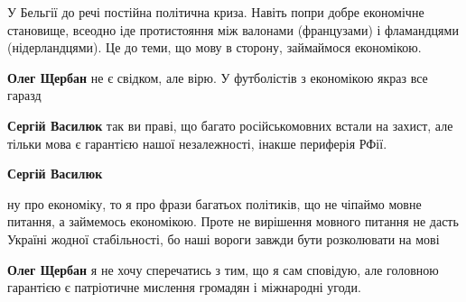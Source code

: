 \begin{itemize}
\begin{itemize}
У Бельгії до речі постійна політична криза. Навіть попри добре економічне
становище, всеодно іде протистояння між валонами (французами) і фламандцями
(нідерландцями). Це до теми, що мову в сторону, займаймося економікою.

 
\textbf{Олег Щербан} не є свідком, але вірю. У футболістів з економікою якраз все гаразд

 
\textbf{Сергій Василюк} так ви праві, що багато російськомовних встали на
захист, але тільки мова є гарантією нашої незалежності, інакше периферія РФії.

 
\textbf{Сергій Василюк} 

ну про економіку, то я про фрази багатьох політиків, що не чіпаймо мовне
питання, а займемось економікою. Проте не вирішення мовного питання не дасть
Україні жодної стабільності, бо наші вороги завжди бути розколювати на мові

 
\textbf{Олег Щербан} я не хочу сперечатись з тим, що я сам сповідую, але головною гарантією є патріотичне мислення громадян і міжнародні угоди.

 

\end{itemize}
\end{itemize}
